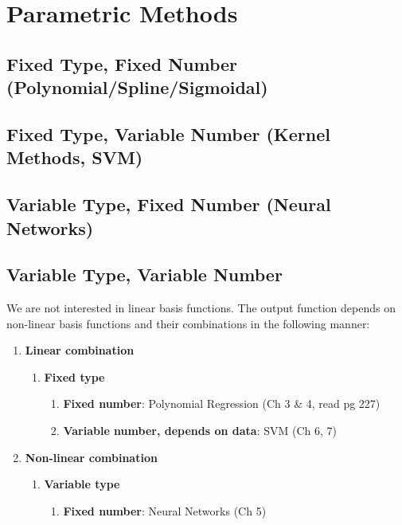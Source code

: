 \documentclass{book}
\begin{document}
\section{Parametric Methods}

\subsection{Fixed Type, Fixed Number (Polynomial/Spline/Sigmoidal)}


\subsection{Fixed Type, Variable Number (Kernel Methods, SVM)} 

\subsection{Variable Type, Fixed Number (Neural Networks)} 

\subsection{Variable Type, Variable Number } 
We are not interested in linear basis functions.
The output function depends on non-linear basis functions and their combinations in the following manner:

\begin{enumerate}
\item {\textbf{Linear combination}}
\begin{enumerate}
\item {\color{OliveGreen}\textbf{Fixed type}}
\begin{enumerate}
\item {\color{blue}\textbf{Fixed number}}: Polynomial Regression (Ch 3 \& 4, read pg 227) 
\item {\color{blue}\textbf{Variable number, depends on data}}: SVM (Ch 6, 7)
\end{enumerate}
\end{enumerate}
\item {\textbf{Non-linear combination}}
\begin{enumerate}
\item {\color{OliveGreen}\textbf{Variable type}}
\begin{enumerate}
\item {\color{blue}\textbf{Fixed number}}: Neural Networks (Ch 5)
\end{enumerate}
\end{enumerate}
\end{enumerate}






\cite{GaussProc_SimpleIntro}
\cite{BOOK_GMPL}



\nocite{*}
\printbibheading[title={Bibliography},heading=bibnumbered]
\printbibliography[title={Books},type=book,heading=subbibnumbered]
\printbibliography[title={Articles},type=article,heading=subbibnumbered]
\printbibliography[title={Web Pages},type=misc,heading=subbibnumbered]
\printindex
\end{document}
